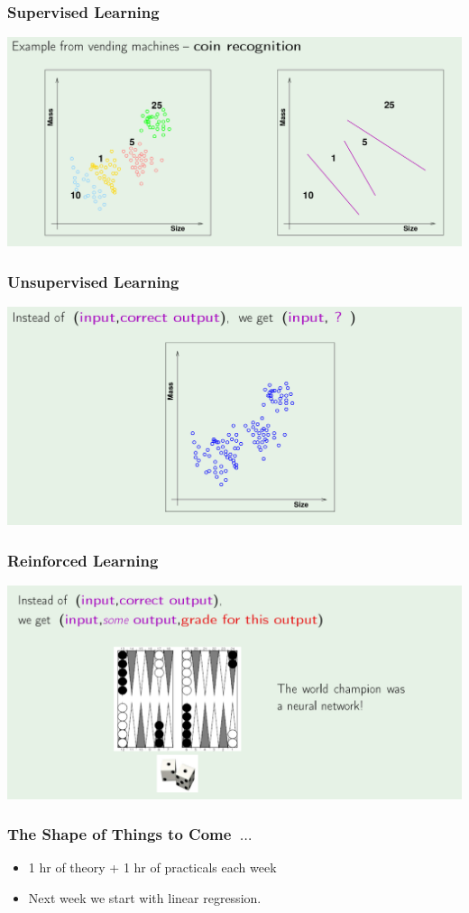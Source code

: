 \documentclass[xcolor=table]{beamer}
\begin{document}
\begin{frame}[t]
\frametitle{Supervised Learning}
\begin{center}
\includegraphics[scale=0.22]{supervised_learning.png}
\end{center}
\end{frame}

\begin{frame}[t]
\frametitle{Unsupervised Learning}
\begin{center}
\includegraphics[scale=0.22]{unsupervised_learning.png}
\end{center}
\end{frame}

\begin{frame}[t]
\frametitle{Reinforced Learning}
\begin{center}
\includegraphics[scale=0.22]{reinforced_learning.png}
\end{center}
\end{frame}

\begin{frame}[t]
\frametitle{The Shape of Things to Come~$\ldots$}
\begin{itemize}
    \item 1 hr of theory + 1 hr of practicals each week
    \item Next week we start with linear regression. 
\end{itemize}
\end{frame}
\end{document}
